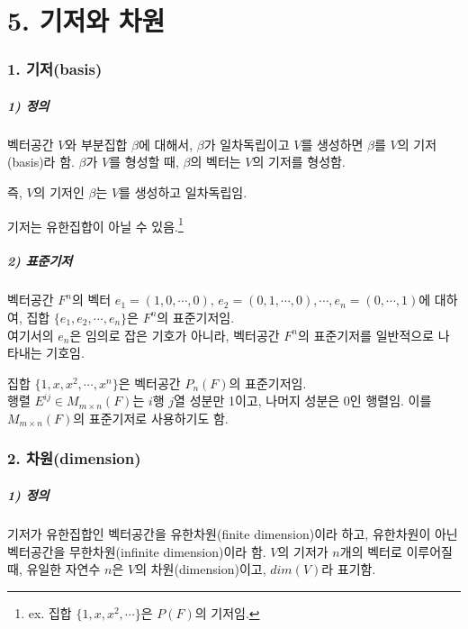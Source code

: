 \documentclass[10pt, a4paper]{article}
\begin{document}
\newpage


\part*{5. 기저와 차원}

\section*{1. 기저(basis)}

\subsubsection*{1) 정의}
벡터공간 $V$와 부분집합 $\beta$에 대해서, $\beta$가 일차독립이고 $V$를 생성하면 $\beta$를 $V$의 기저(basis)라 함. $\beta$가 $V$를 형성할 때, $\beta$의 벡터는 $V$의 기저를 형성함.

즉, $V$의 기저인 $\beta$는 $V$를 생성하고 일차독립임.

기저는 유한집합이 아닐 수 있음.\footnote{ex. 집합 $\{1,x,x^2, \cdots \}$은 $P(F)$의 기저임.}


\subsubsection*{2) 표준기저}
벡터공간 $F^n$의 벡터 $e_1=(1,0, \cdots ,0),\,e_2=(0,1, \cdots ,0), \cdots ,e_n=(0, \cdots ,1)$에 대하여, 집합 $\{e_1,e_2, \cdots ,e_n\}$은 $F^n$의 표준기저임.\\
여기서의 $e_n$은 임의로 잡은 기호가 아니라, 벡터공간 $F^n$의 표준기저를 일반적으로 나타내는 기호임.

집합 $\{1,x,x^2, \cdots ,x^n\}$은 벡터공간 $P_n(F)$의 표준기저임.\\

행렬 $E^{ij} \in M_{m \times n}(F)$는 $i$행 $j$열 성분만 1이고, 나머지 성분은 0인 행렬임. 이를 $M_{m \times n}(F)$의 표준기저로 사용하기도 함.


\section*{2. 차원(dimension)}
\subsubsection*{1) 정의}
기저가 유한집합인 벡터공간을 유한차원(finite dimension)이라 하고, 유한차원이 아닌 벡터공간을 무한차원(infinite dimension)이라 함. $V$의 기저가 $n$개의 벡터로 이루어질 때, 유일한 자연수 $n$은 $V$의 차원(dimension)이고, $dim(V)$라 표기함.\\
\end{document}
